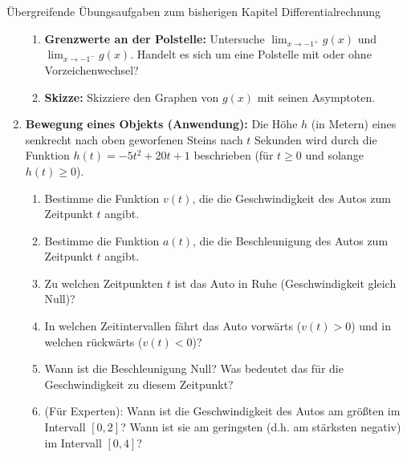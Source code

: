 \begin{aufgabenumgebung}[A:DiffUebergreifend]{Übergreifende Übungsaufgaben zum bisherigen Kapitel Differentialrechnung}
\begin{enumerate}
\begin{enumerate}
            \item \textbf{Grenzwerte an der Polstelle:} Untersuche $\lim_{x \to -1^+} g(x)$ und $\lim_{x \to -1^-} g(x)$. Handelt es sich um eine Polstelle mit oder ohne Vorzeichenwechsel?
            \item \textbf{Skizze:} Skizziere den Graphen von $g(x)$ mit seinen Asymptoten.
        \end{enumerate}
    \item \textbf{Bewegung eines Objekts (Anwendung):}
        Die Höhe $h$ (in Metern) eines senkrecht nach oben geworfenen Steins nach $t$ Sekunden wird durch die Funktion $h(t) = -5t^2 + 20t + 1$ beschrieben (für $t \ge 0$ und solange $h(t) \ge 0$).
        \begin{enumerate}
            \item Bestimme die Funktion $v(t)$, die die Geschwindigkeit des Autos zum Zeitpunkt $t$ angibt.
            \item Bestimme die Funktion $a(t)$, die die Beschleunigung des Autos zum Zeitpunkt $t$ angibt.
            \item Zu welchen Zeitpunkten $t$ ist das Auto in Ruhe (Geschwindigkeit gleich Null)?
            \item In welchen Zeitintervallen fährt das Auto vorwärts ($v(t)>0$) und in welchen rückwärts ($v(t)<0$)?
            \item Wann ist die Beschleunigung Null? Was bedeutet das für die Geschwindigkeit zu diesem Zeitpunkt?
            \item (Für Experten): Wann ist die Geschwindigkeit des Autos am größten im Intervall $[0, 2]$? Wann ist sie am geringsten (d.h. am stärksten negativ) im Intervall $[0, 4]$?
        \end{enumerate}
\end{enumerate}
\end{aufgabenumgebung}

